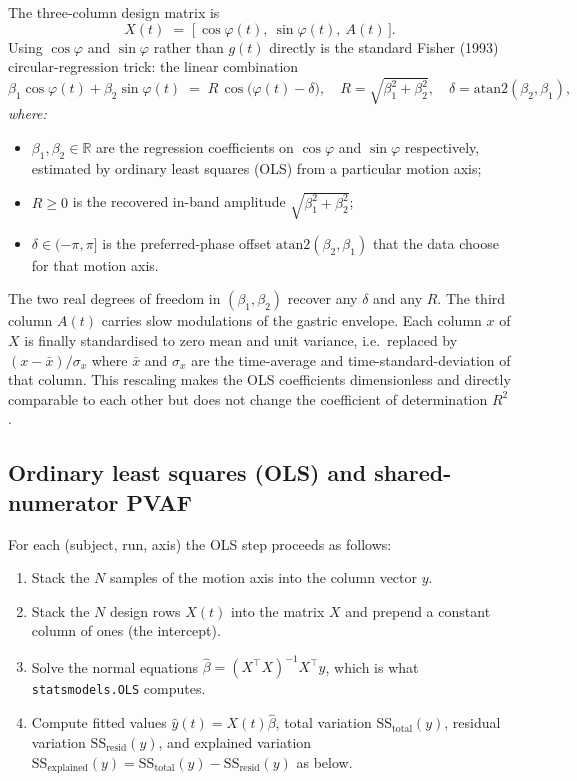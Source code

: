 \documentclass[11pt]{article}
\newcommand{\SSE}{\mathrm{SS_{explained}}}
\newcommand{\SST}{\mathrm{SS_{total}}}
\newcommand{\SSR}{\mathrm{SS_{resid}}}
\begin{document}
The three-column design matrix is
\begin{equation}
X(t) \;=\; \bigl[\,\cos\varphi(t),\ \sin\varphi(t),\ A(t)\,\bigr].
\label{eq:designmatrix}
\end{equation}
Using $\cos\varphi$ and $\sin\varphi$ rather than $g(t)$ directly is the
standard Fisher (1993) circular-regression trick: the linear combination
\begin{equation}
\beta_1\cos\varphi(t) + \beta_2\sin\varphi(t)
\;=\; R\,\cos\!\bigl(\varphi(t) - \delta\bigr),
\quad
R = \sqrt{\beta_1^{2}+\beta_2^{2}},
\quad
\delta = \mathrm{atan2}(\beta_2,\beta_1),
\end{equation}
\textit{where:}
\begin{itemize}\setlength{\itemsep}{1pt}
\item $\beta_1, \beta_2 \in \mathbb{R}$ are the regression coefficients
on $\cos\varphi$ and $\sin\varphi$ respectively, estimated by ordinary
least squares (OLS) from a particular motion axis;
\item $R \geq 0$ is the recovered in-band amplitude
$\sqrt{\beta_1^2 + \beta_2^2}$;
\item $\delta \in (-\pi,\pi]$ is the preferred-phase offset
$\mathrm{atan2}(\beta_2,\beta_1)$ that the data choose for that motion
axis.
\end{itemize}
The two real degrees of freedom in $(\beta_1,\beta_2)$ recover any
$\delta$ and any $R$. The third column $A(t)$ carries slow modulations
of the gastric envelope. Each column $x$ of $X$ is finally
standardised to zero mean and unit variance, i.e.\ replaced by
$(x - \bar x)/\sigma_x$ where $\bar x$ and $\sigma_x$ are the
time-average and time-standard-deviation of that column. This
rescaling makes the OLS coefficients dimensionless and directly
comparable to each other but does not change the coefficient of
determination $R^{2}$.

\subsection{Ordinary least squares (OLS) and shared-numerator PVAF}

For each (subject, run, axis) the OLS step proceeds as follows:
\begin{enumerate}
\item Stack the $N$ samples of the motion axis into the column vector
$y$.
\item Stack the $N$ design rows $X(t)$ into the matrix $X$ and prepend a
constant column of ones (the intercept).
\item Solve the normal equations
$\hat\beta = (X^\top X)^{-1} X^\top y$, which is what
\texttt{statsmodels.OLS} computes.
\item Compute fitted values $\hat y(t) = X(t)\hat\beta$, total
variation $\SST(y)$, residual variation $\SSR(y)$, and explained
variation $\SSE(y) = \SST(y) - \SSR(y)$ as below.
\end{enumerate}
\end{document}
